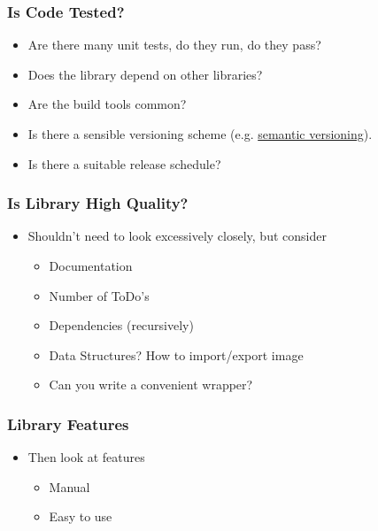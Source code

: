 \subsubsection{Is Code Tested?}\label{is-code-tested}

\begin{itemize}
\itemsep1pt\parskip0pt
\item
  Are there many unit tests, do they run, do they pass?
\item
  Does the library depend on other libraries?
\item
  Are the build tools common?
\item
  Is there a sensible versioning scheme (e.g.
  \href{http://www.semver.org/}{semantic versioning}).
\item
  Is there a suitable release schedule?
\end{itemize}

\subsubsection{Is Library High Quality?}\label{is-library-high-quality}

\begin{itemize}
\itemsep1pt\parskip0pt
\item
  Shouldn't need to look excessively closely, but consider

  \begin{itemize}
  \itemsep1pt\parskip0pt
  \item
    Documentation
  \item
    Number of ToDo's
  \item
    Dependencies (recursively)
  \item
    Data Structures? How to import/export image
  \item
    Can you write a convenient wrapper?
  \end{itemize}
\end{itemize}

\subsubsection{Library Features}\label{library-features}

\begin{itemize}
\itemsep1pt\parskip0pt
\item
  Then look at features

  \begin{itemize}
  \itemsep1pt\parskip0pt
  \item
    Manual
  \item
    Easy to use
  \end{itemize}
\end{itemize}

